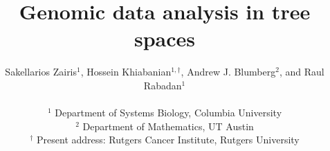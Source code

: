 \documentclass[a4paper,11pt]{article}
\begin{document}
\title{Genomic data analysis in tree spaces}

\author{Sakellarios Zairis$^{1}$, Hossein Khiabanian$^{1,\dagger}$, Andrew J. Blumberg$^{2}$, and Raul Rabadan$^{1}$\\
\\
$^1$ Department of Systems Biology, Columbia University\\
$^2$ Department of Mathematics, UT Austin\\
$^\dagger$ Present address: Rutgers Cancer Institute, Rutgers University\\}
\maketitle

\end{document}
